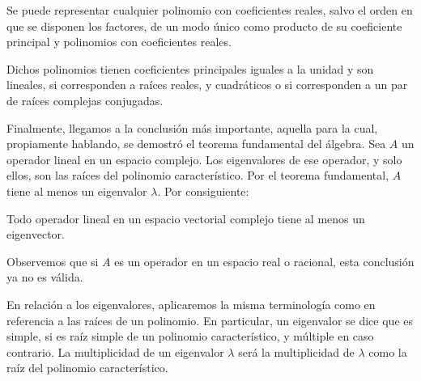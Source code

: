 \begin{tcolorbox}[
    theorem style=change apart,
    enhanced,
    lower separated=false,
    breakable,
    boxrule=0pt,
    frame hidden,
    colback=black!7!white,
    coltitle=black,
    boxed title style={colframe=white, colback=white, boxrule=0pt},
    fontupper=\normalsize,
    before upper={\abovedisplayskip=8pt\belowdisplayskip=8pt},
    left=1mm,
    right=1mm,
    top=1mm,
    bottom=1mm,
    sharp corners,
]
    Se puede representar cualquier polinomio con coeficientes reales, salvo el orden en que se disponen los factores, de un modo único como producto de su coeficiente principal y polinomios con coeficientes reales.
\end{tcolorbox}

Dichos polinomios tienen coeficientes principales iguales a la unidad y son lineales, si corresponden a raíces reales, y cuadráticos o si corresponden a un par de raíces complejas conjugadas.

Finalmente, llegamos a la conclusión más importante, aquella para la cual, propiamente hablando, se demostró el teorema fundamental del álgebra. Sea $A$ un operador lineal en un espacio complejo. Los eigenvalores de ese operador, y solo ellos, son las raíces del polinomio característico. Por el teorema fundamental, $A$ tiene al menos un eigenvalor $\lambda$. Por consiguiente:

\begin{tcolorbox}[
    theorem style=change apart,
    enhanced,
    lower separated=false,
    breakable,
    boxrule=0pt,
    frame hidden,
    colback=black!7!white,
    coltitle=black,
    boxed title style={colframe=white, colback=white, boxrule=0pt},
    fontupper=\normalsize,
    before upper={\abovedisplayskip=8pt\belowdisplayskip=8pt},
    left=1mm,
    right=1mm,
    top=1mm,
    bottom=1mm,
    sharp corners,
]
    Todo operador lineal en un espacio vectorial complejo tiene al menos un eigenvector.
\end{tcolorbox}

Observemos que si $A$ es un operador en un espacio real o racional, esta conclusión ya no es válida.

En relación a los eigenvalores, aplicaremos la misma terminología como en referencia a las raíces de un polinomio. En particular, un eigenvalor se dice que es simple, si es raíz simple de un polinomio característico, y múltiple en caso contrario. La multiplicidad de un eigenvalor $\lambda$ será la multiplicidad de $\lambda$ como la raíz del polinomio característico.